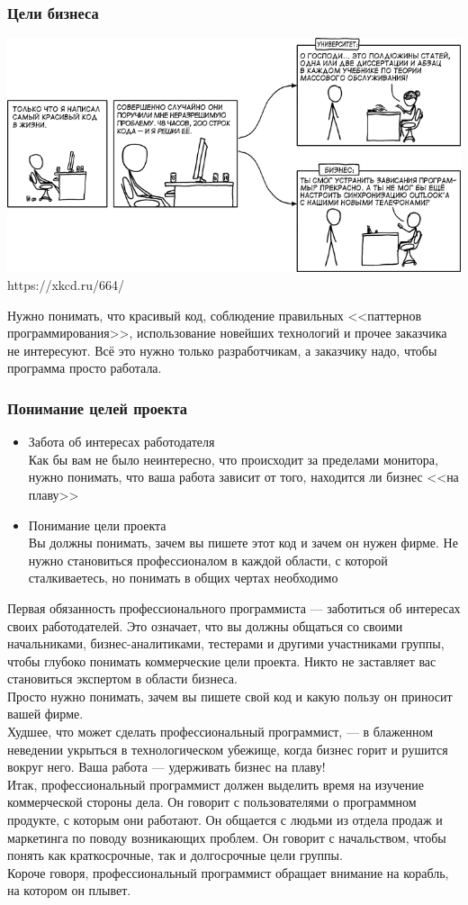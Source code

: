 \documentclass{../industrial-development}
\begin{document}
\begin{frame} \frametitle{Цели бизнеса}
{\includegraphics[width=\linewidth]{xkcd.png}}
\scriptsize https://xkcd.ru/664/
\end{frame}
\lecturenotes
Нужно понимать, что красивый код, соблюдение правильных <<паттернов программирования>>, использование новейших технологий и прочее заказчика не интересуют. Всё это нужно только разработчикам, а заказчику надо, чтобы программа просто работала.

\begin{frame} \frametitle{Понимание целей проекта}
\begin{itemize}
  \item Забота об интересах работодателя\\
	Как бы вам не было неинтересно, что происходит за пределами монитора, нужно понимать, что ваша работа зависит от того, находится ли бизнес <<на плаву>>
  \item Понимание цели проекта\\
	Вы должны понимать, зачем вы пишете этот код и зачем он нужен фирме. Не нужно становиться профессионалом в каждой области, с которой сталкиваетесь, но понимать в общих чертах необходимо
\end{itemize}
\end{frame}
\lecturenotes
Первая обязанность профессионального программиста — заботиться об интересах своих работодателей. Это означает, что вы должны общаться со своими начальниками, бизнес-аналитиками, тестерами и другими участниками группы, чтобы глубоко понимать коммерческие цели проекта. Никто не заставляет вас становиться экспертом в области бизнеса.\\
Просто нужно понимать, зачем вы пишете свой код и какую пользу он приносит вашей фирме.\\
Худшее, что может сделать профессиональный программист, — в блаженном неведении укрыться в технологическом убежище, когда бизнес горит и рушится вокруг него. Ваша работа — удерживать бизнес на плаву!\\
Итак, профессиональный программист должен выделить время на изучение коммерческой стороны дела. Он говорит с пользователями о программном продукте, с которым они работают. Он общается с людьми из отдела продаж и маркетинга по поводу возникающих проблем. Он говорит с начальством, чтобы понять как краткосрочные, так и долгосрочные цели группы.\\
Короче говоря, профессиональный программист обращает внимание на корабль, на котором он плывет.
\end{document}
